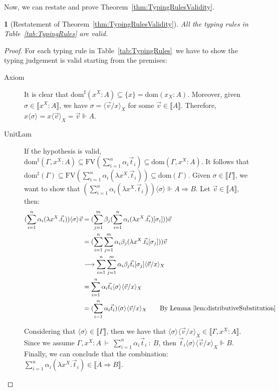 \documentclass[a4paper,UKenglish,numberwithinsect,pdfa,anonymous]{lipics-v2021}
\theoremstyle{restatestyle}
\newtheorem*{restatetheorem}{}
\newcommand\lra{\longrightarrow}
\newcommand\ansubst[2]{\ensuremath{\langle #1 \rangle_{#2}}}
\newcommand\dom[1]{\mathrm{dom}(#1)}
\newcommand\sdom[1]{\mathrm{dom}^{\sharp}(#1)}
\newcommand\FV[1]{\mathrm{FV}(#1)}
\def\Lam#1#2#3{\lambda#1^{#2}{.}#3} %
\def\Arr{\Rightarrow}
\def\sem#1{\llbracket#1\rrbracket}
\def\TYP#1#2#3{#1~{\vdash}~#2~{:}~#3}
\def\real{\Vdash}
\begin{document}
Now, we can restate and prove Theorem~\ref{thm:TypingRulesValidity}.
\begin{restatetheorem}[Restatement of Theorem~\ref{thm:TypingRulesValidity}]
  \itshape
  All the typing rules in Table~\ref{tab:TypingRules} are valid.
\end{restatetheorem}
\begin{proof}
    For each typing rule in Table~\ref{tab:TypingRules}~we have to show the typing judgement is valid starting from the premises:
    \begin{description}
    \item[Axiom] It is clear that $\sdom{x^X:A}\subseteq\{x\}=\dom{x_X:A}$. Moreover, given $\sigma\in\sem{x^X:A}$, we have $\sigma=\ansubst{\vec v/x}{X}$ for some $\vec{v}\in\sem{A}$. Therefore, $x\ansubst{\sigma}{}=x\ansubst{\vec v}{X}=\vec{v}\real A$.
    
    \item[UnitLam] If the hypothesis is valid, $\sdom{\Gamma,x^X:A}\subseteq \FV{\sum_{i=1}^{n}\alpha_i \vec{t}_{i}}\subseteq \dom{\Gamma,x^X:A}$. It follows that $\sdom{\Gamma}\subseteq \FV{\sum_{i=1}^{n}\alpha_i (\Lam{x}{X}{\vec{t}_{i}})}\subseteq \dom{\Gamma}$. Given $\sigma\in\sem{\Gamma}$, we want to show that $(\sum_{i=1}^{n}\alpha_i (\Lam{x}{X}{\vec{t}_{i}}))\ansubst{\sigma}{}\real A\Arr B$. Let $\vec v\in\sem{A}$, then:
    \begin{align*}
        (\sum_{i=1}^{n} \alpha_i(\Lam{x}{X}{\vec{t}_{i}}))\ansubst{\sigma}{} \vec v&= (\sum_{j=1}^{m} \beta_j (\sum_{i=1}^{n} \alpha_i (\Lam{x}{X}{\vec{t}_{i}}) [\sigma_i])) \vec{v} \\
        &= (\sum_{i=1}^{n}\sum_{j=1}^{m}\alpha_i\beta_j (\Lam{x}{X}{\vec{t}_{i}[\sigma_j]}))\vec v\\
        &\lra \sum_{i=1}^{n}\sum_{j=1}^{m}\alpha_i\beta_j \vec{t}_{i}[\sigma_j]\ansubst{\vec v/x}{X}\\
        &=\sum_{i=1}^{n}\alpha_i \vec{t}_{i}\ansubst{\sigma}{}\ansubst{\vec v/x}{X}\\
        &=(\sum_{i=1}^{n}\alpha_i \vec{t}_{i})\ansubst{\sigma}{}\ansubst{\vec v/x}{X}\qquad{\text{By Lemma~\ref{lem:distributiveSubstitution}}}
    \end{align*}
    
    Considering that $\ansubst{\sigma}{}\in\sem{\Gamma}$, then we have that $\ansubst{\sigma}{}\ansubst{\vec v/x}{X}\in\sem{\Gamma,x^X:A}$. Since we assume $\TYP{\Gamma, x^X:A}{\sum_{i=1}^{n}\alpha_i\vec{t}_{i}}{B}$, then $\vec{t}_{i}\ansubst{\sigma}{}\ansubst{\vec v/x}{X}\real B$. Finally, we can conclude that the combination: $\sum_{i=1}^{n}\alpha_i (\Lam{x}{X}{\vec{t}_{i}})\in\sem{A\Arr B}$.


\end{description}
\end{proof}
\end{document}
